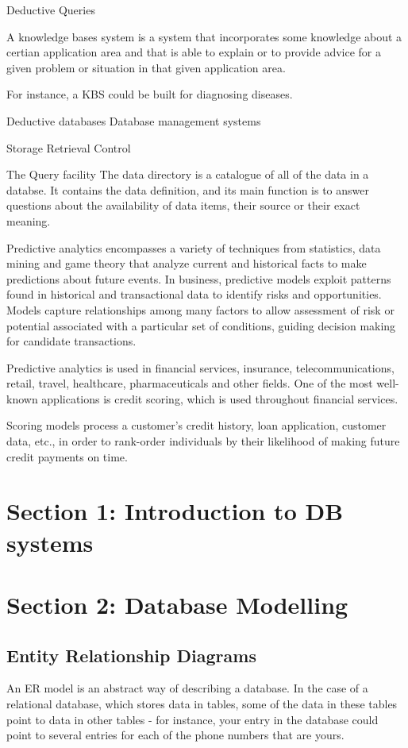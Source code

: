 \documentclass[]{article}
\begin{document}
Deductive Queries

A knowledge bases system is a system that incorporates some knowledge about a certian application area and that is able to explain or to provide advice for a given problem or situation in that given application area.

For instance, a KBS could be built for diagnosing diseases.

Deductive databases
Database management systems

Storage
Retrieval
Control

The Query facility
The data directory is a catalogue of all of the data in a databse. It contains the data definition, and its main function is to answer questions about the availability of data items, their source or their exact meaning.


Predictive analytics encompasses a variety of techniques from statistics, data mining and game theory that analyze current and historical facts to make predictions about future events.
In business, predictive models exploit patterns found in historical and transactional data to identify risks and opportunities. Models capture relationships among many factors to allow assessment of risk or potential associated with a particular set of conditions, guiding decision making for candidate transactions.

Predictive analytics is used in financial services, insurance, telecommunications, retail, travel, healthcare, pharmaceuticals and other fields.
One of the most well-known applications is credit scoring, which is used throughout financial services. 

Scoring models process a customer’s credit history, loan application, customer data, etc., in order to rank-order individuals by their likelihood of making future credit payments on time.



\newpage 
\section{Section 1: Introduction to DB systems}
\newpage

\section{Section 2: Database Modelling}
\subsection{Entity Relationship Diagrams}
An ER model is an abstract way of describing a database. In the case of a relational database, which stores data in tables, some of the data in these tables point to data in other tables - for instance, your entry in the database could point to several entries for each of the phone numbers that are yours. 
\end{document}
